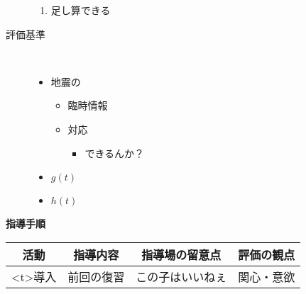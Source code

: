 \documentclass[a4j,14pt]{jsarticle}
\begin{document}
\begin{description}
\begin{enumerate}
            \item 足し算できる
        \end{enumerate}
        \item[評価基準]\
        \begin{itemize}
            \item 地震の
                  \begin{itemize}
                      \item 臨時情報
                      \item 対応
                            \begin{itemize}
                                \item できるんか？
                            \end{itemize}
                  \end{itemize}
            \item \(g(t)\)
            \item \(h(t)\)
        \end{itemize}
\end{description}
\newpage
\fontsize{10pt}{0cm}\selectfont

\noindent\textbf{指導手順}
\begin{table}[h]
    \fontsize{8pt}{0}\selectfont
    \newcommand{\activee}{0.1\textwidth}
    \newcommand{\valuee}{0.41\textwidth}
    \newcommand{\pointt}{0.24\textwidth}
    \newcommand{\evaluationn}{0.1\textwidth}
    \centering
    \begin{tabular}{|c|c|c|c|}
        \hline
        活動                       & {指導内容} & {指導場の留意点} & 評価の観点 \\
        \hline
        \begin{minipage}{\activee}
            \centering
            \pbox<t>{導入}
        \end{minipage} &
        \begin{minipage}{\valuee}
            前回の復習
        \end{minipage}  &
        \begin{minipage}{\pointt}
            この子はいいねぇ
        \end{minipage}  &
        \begin{minipage}{\evaluationn}
            関心・意欲
        \end{minipage}                                           \\
        \hline
    \end{tabular}
\end{table}
\end{document}
